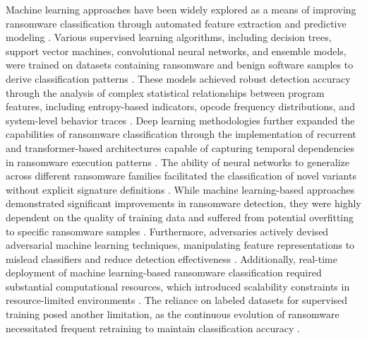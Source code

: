 Machine learning approaches have been widely explored as a means of improving ransomware classification through automated feature extraction and predictive modeling \cite{ limer2024automated}. Various supervised learning algorithms, including decision trees, support vector machines, convolutional neural networks, and ensemble models, were trained on datasets containing ransomware and benign software samples to derive classification patterns \cite{aguiluz2024innovative}. These models achieved robust detection accuracy through the analysis of complex statistical relationships between program features, including entropy-based indicators, opcode frequency distributions, and system-level behavior traces \cite{boughton2024dynamic}. Deep learning methodologies further expanded the capabilities of ransomware classification through the implementation of recurrent and transformer-based architectures capable of capturing temporal dependencies in ransomware execution patterns \cite{hill2024dynamic}. The ability of neural networks to generalize across different ransomware families facilitated the classification of novel variants without explicit signature definitions \cite{neghana2024dynamic}. While machine learning-based approaches demonstrated significant improvements in ransomware detection, they were highly dependent on the quality of training data and suffered from potential overfitting to specific ransomware samples \cite{gromov2024novel}. Furthermore, adversaries actively devised adversarial machine learning techniques, manipulating feature representations to mislead classifiers and reduce detection effectiveness \cite{aqazi2024hierarchical}. Additionally, real-time deployment of machine learning-based ransomware classification required substantial computational resources, which introduced scalability constraints in resource-limited environments \cite{lummen2024opcode}. The reliance on labeled datasets for supervised training posed another limitation, as the continuous evolution of ransomware necessitated frequent retraining to maintain classification accuracy \cite{ azzaman2024dynamic}.